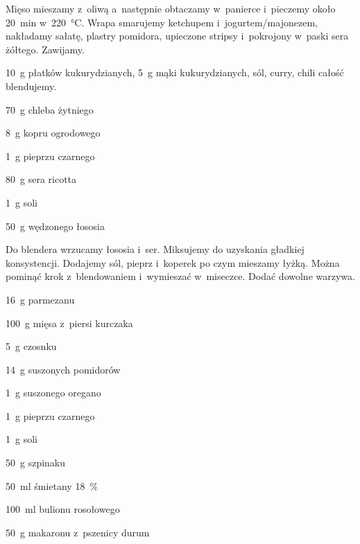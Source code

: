 \documentclass[../kucharek.tex]{subfiles}
\begin{document}
Mięso mieszamy z~oliwą a~następnie obtaczamy w~panierce i~pieczemy około
\qty{20}{\minute} w~\qty{220}{\celsius}. Wrapa smarujemy ketchupem
i~jogurtem/majonezem, nakładamy sałatę, plastry pomidora, upieczone stripsy
i~pokrojony w~paski sera żółtego. Zawijamy.

 \qty{10}{\gram} płatków kukurydzianych, \qty{5}{\gram} mąki
kukurydzianych, sól, curry, chili całość blendujemy.


\begin{Ingred}
    \item \qty{70}{\gram} chleba żytniego
    \item \qty{8}{\gram} kopru ogrodowego
    \item \qty{1}{\gram} pieprzu czarnego
    \item \qty{80}{\gram} sera ricotta
    \item \qty{1}{\gram} soli
    \item \qty{50}{\gram} wędzonego łososia
\end{Ingred}

Do blendera wrzucamy łososia i~ser. Miksujemy do uzyskania gładkiej
konsystencji. Dodajemy sól, pieprz i~koperek po czym mieszamy łyżką. Można
pominąć krok z~blendowaniem i~wymieszać w~miseczce. Dodać dowolne warzywa.


\begin{Ingred}
    \item \qty{16}{\gram} parmezanu
    \item \qty{100}{\gram} mięsa z~piersi kurczaka
    \item \qty{5}{\gram} czosnku
    \item \qty{14}{\gram} suszonych pomidorów
    \item \qty{1}{\gram} suszonego oregano
    \item \qty{1}{\gram} pieprzu czarnego
    \item \qty{1}{\gram} soli
    \item \qty{50}{\gram} szpinaku
    \item \qty{50}{\milli\litre} śmietany \qty{18}{\percent}
    \item \qty{100}{\milli\litre} bulionu rosołowego
    \item \qty{50}{\gram} makaronu z~pszenicy durum
\end{Ingred}
\end{document}
